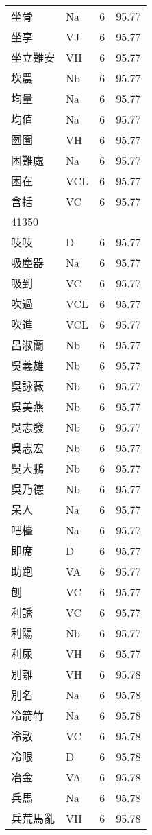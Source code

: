 \documentclass[twocolumn]{book}
\begin{document}
\begin{supertabular}{llrr}
坐骨 & Na & 6 &  95.77\\
坐享 & VJ & 6 &  95.77\\
坐立難安 & VH & 6 &  95.77\\
坎農 & Nb & 6 &  95.77\\
均量 & Na & 6 &  95.77\\
均值 & Na & 6 &  95.77\\
囫圇 & VH & 6 &  95.77\\
困難處 & Na & 6 &  95.77\\
困在 & VCL & 6 &  95.77\\
含括 & VC & 6 &  95.77\\
41350\\
吱吱 & D & 6 &  95.77\\
吸塵器 & Na & 6 &  95.77\\
吸到 & VC & 6 &  95.77\\
吹過 & VCL & 6 &  95.77\\
吹進 & VCL & 6 &  95.77\\
呂淑蘭 & Nb & 6 &  95.77\\
吳義雄 & Nb & 6 &  95.77\\
吳詠薇 & Nb & 6 &  95.77\\
吳美燕 & Nb & 6 &  95.77\\
吳志發 & Nb & 6 &  95.77\\
吳志宏 & Nb & 6 &  95.77\\
吳大鵬 & Nb & 6 &  95.77\\
吳乃德 & Nb & 6 &  95.77\\
呆人 & Na & 6 &  95.77\\
吧檯 & Na & 6 &  95.77\\
即席 & D & 6 &  95.77\\
助跑 & VA & 6 &  95.77\\
刨 & VC & 6 &  95.77\\
利誘 & VC & 6 &  95.77\\
利陽 & Nb & 6 &  95.77\\
利尿 & VH & 6 &  95.77\\
別離 & VH & 6 &  95.78\\
別名 & Na & 6 &  95.78\\
冷箭竹 & Na & 6 &  95.78\\
冷敷 & VC & 6 &  95.78\\
冷眼 & D & 6 &  95.78\\
冶金 & VA & 6 &  95.78\\
兵馬 & Na & 6 &  95.78\\
兵荒馬亂 & VH & 6 &  95.78\\

\end{supertabular}
\end{document}
